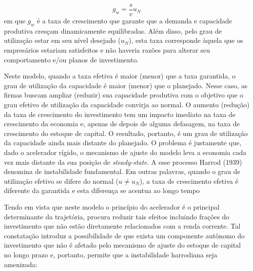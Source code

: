\begin{equation}
    \label{Fundamental}
    g_w = \frac{s}{v}u_N
\end{equation}
em que $g_w$ é a taxa de crescimento que garante que a demanda e capacidade produtiva cresçam dinamicamente equilibradas. Além disso, pelo grau de utilização estar em seu nível desejado ($u_N$), esta taxa corresponde àquela que os empresários estariam satisfeitos e não haveria razões para alterar seu comportamento e/ou planos de investimento. 

Neste modelo, quando a taxa efetiva é maior (menor) que a taxa garantida, o grau de utilização da capacidade é maior (menor) que o planejado. Nesse caso, as firmas buscam ampliar (reduzir) sua capacidade produtiva com o objetivo que o grau efetivo de utilização da capacidade convirja ao normal. O aumento (redução) da taxa de crescimento do investimento tem um impacto imediato na taxa de crescimento da
economia e, apenas de depois de alguma defasagem, na taxa de crescimento do estoque de capital. O resultado, portanto, é um grau de utilização da capacidade ainda mais distante do planejado. O problema é justamente que, dado o acelerador rígido, o mecanismo de ajuste do modelo leva a economia cada vez mais distante da sua posição de \textit{steady-state}. A esse processo Harrod (1939) denomina de instabilidade fundamental. Em outras palavras, quando o grau de utilização efetivo se difere do normal ($u\neq u_N$),  a taxa de crescimento efetiva é diferente da garantida e esta diferença se acentua ao longo tempo





Tendo em vista que neste modelo o princípio do acelerador é o principal determinante da trajetória, \textcite[p.~26--28]{harrod_essay_1939} procura reduzir tais efeitos incluindo frações do investimento que não estão diretamente relacionados com a renda corrente. Tal constatação introduz a possibilidade de que exista um componente autônomo do investimento que não é afetado pelo mecanismo de ajuste do estoque de capital no longo prazo e, portanto, permite que a instabilidade harrodiana seja amenizada:


